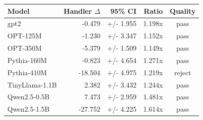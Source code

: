 \begin{tabular}{lrrrc}
\toprule
Model & Handler $\Delta$ & 95\% CI & Ratio & Quality \\
\midrule
gpt2 & -0.479 & +/- 1.955 & 1.198x & pass \\
OPT-125M & -1.230 & +/- 3.347 & 1.152x & pass \\
OPT-350M & -5.379 & +/- 1.509 & 1.149x & pass \\
Pythia-160M & -0.823 & +/- 4.654 & 1.271x & pass \\
Pythia-410M & -18.504 & +/- 4.975 & 1.219x & reject \\
TinyLlama-1.1B & 2.382 & +/- 3.432 & 1.244x & pass \\
Qwen2.5-0.5B & 7.473 & +/- 2.959 & 1.481x & pass \\
Qwen2.5-1.5B & -27.752 & +/- 4.225 & 1.614x & pass \\
\bottomrule
\end{tabular}
